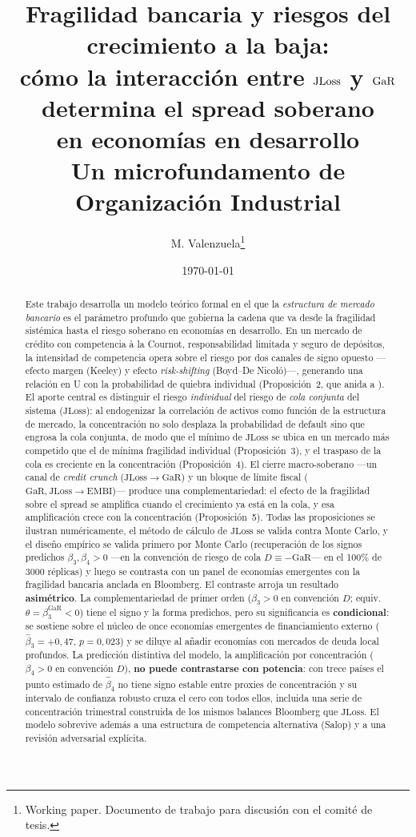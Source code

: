 \documentclass[11pt]{article}
\title{\textbf{Fragilidad bancaria y riesgos del crecimiento a la baja:\\
cómo la interacción entre $\JLoss$ y $\GaR$ determina el spread soberano\\
en economías en desarrollo}\\[4pt]
\large Un microfundamento de Organización Industrial}
\author{M. Valenzuela\thanks{Working paper. Documento de trabajo para discusión con el comité de tesis.}}
\date{\today}
\theoremstyle{plain}
\theoremstyle{definition}
\theoremstyle{remark}
\newcommand{\JLoss}{\mathrm{JLoss}}
\newcommand{\EMBI}{\mathrm{EMBI}}
\newcommand{\GaR}{\mathrm{GaR}}
\newcommand{\1}{\mathbf{1}}
\begin{document}
\maketitle

\begin{abstract}
\noindent Este trabajo desarrolla un modelo teórico formal en el que la \textit{estructura de mercado bancario} es el parámetro profundo que gobierna la cadena que va desde la fragilidad sistémica hasta el riesgo soberano en economías en desarrollo. En un mercado de crédito con competencia à la Cournot, responsabilidad limitada y seguro de depósitos, la intensidad de competencia opera sobre el riesgo por dos canales de signo opuesto ---efecto margen (Keeley) y efecto \textit{risk-shifting} (Boyd--De Nicoló)---, generando una relación en U con la probabilidad de quiebra individual (Proposición~2, que anida a \citealp{MMR2010}). El aporte central es distinguir el riesgo \textit{individual} del riesgo de \textit{cola conjunta} del sistema ($\JLoss$): al endogenizar la correlación de activos como función de la estructura de mercado, la concentración no solo desplaza la probabilidad de default sino que engrosa la cola conjunta, de modo que el mínimo de $\JLoss$ se ubica en un mercado más competido que el de mínima fragilidad individual (Proposición~3), y el traspaso de la cola es creciente en la concentración (Proposición~4). El cierre macro-soberano ---un canal de \textit{credit crunch} ($\JLoss\!\to\!\GaR$) y un bloque de límite fiscal ($\GaR,\JLoss\!\to\!\EMBI$)--- produce una complementariedad: el efecto de la fragilidad sobre el spread se amplifica cuando el crecimiento ya está en la cola, y esa amplificación crece con la concentración (Proposición~5). Todas las proposiciones se ilustran numéricamente, el método de cálculo de $\JLoss$ se valida contra Monte Carlo, y el diseño empírico se valida primero por Monte Carlo (recuperación de los signos predichos $\beta_3,\beta_4>0$ ---en la convención de riesgo de cola $D\equiv-\GaR$--- en el 100\% de $3000$ réplicas) y luego se contrasta con un panel de economías emergentes con la fragilidad bancaria anclada en Bloomberg. El contraste arroja un resultado \textbf{asimétrico}. La complementariedad de primer orden ($\beta_3>0$ en convención $D$; equiv.\ $\theta=\beta_3^{\GaR}<0$) tiene el signo y la forma predichos, pero su significancia es \textbf{condicional}: se sostiene sobre el núcleo de once economías emergentes de financiamiento externo ($\hat\beta_3=+0{,}47$, $p=0{,}023$) y se diluye al añadir economías con mercados de deuda local profundos. La predicción distintiva del modelo, la amplificación por concentración ($\beta_4>0$ en convención $D$), \textbf{no puede contrastarse con potencia}: con trece países el punto estimado de $\hat\beta_4$ no tiene signo estable entre proxies de concentración y su intervalo de confianza robusto cruza el cero con todos ellos, incluida una serie de concentración trimestral construida de los mismos balances Bloomberg que $\JLoss$. El modelo sobrevive además a una estructura de competencia alternativa (Salop) y a una revisión adversarial explícita.


\end{abstract}
\end{document}
